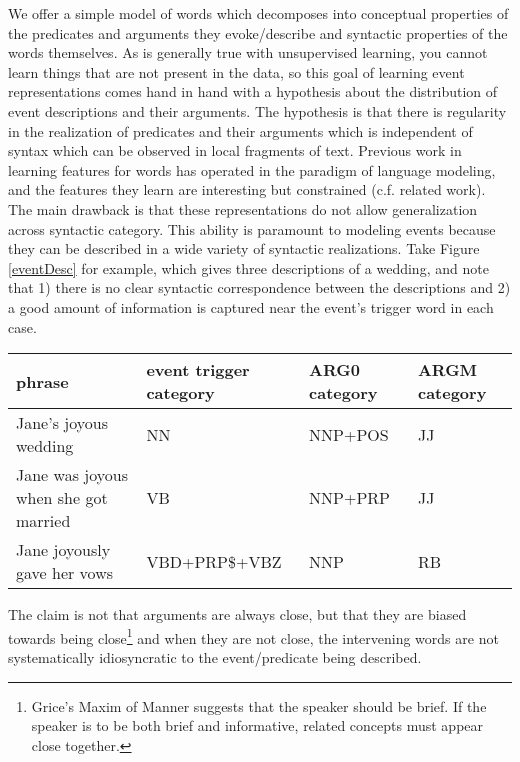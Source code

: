 \documentclass[11pt,letterpaper]{article}
\begin{document}
We offer a simple model of words which decomposes into conceptual properties
of the predicates and arguments they evoke/describe and syntactic properties
of the words themselves.
As is generally true with unsupervised learning, you cannot learn
things that are not present in the data, so this goal of learning event
representations comes hand in hand with a hypothesis about the
distribution of event descriptions and their arguments.
The hypothesis is that there is regularity in the realization of predicates
and their arguments which is independent of syntax which can be observed
in local fragments of text.
Previous work in learning features for words has operated in the
paradigm of language modeling, and the features they learn are
interesting but constrained (c.f. related work).
The main drawback is that these representations do not allow generalization
across syntactic category.
This ability is paramount to modeling events because they can be described
in a wide variety of syntactic realizations.
Take Figure \ref{eventDesc} for example, which gives three descriptions of a wedding,
and note that
1) there is no clear syntactic correspondence between the descriptions
and 2) a good amount of information is captured near the event's trigger word in each case.

% 
\begin{figure*}[ht]
\begin{tabular}{ | l | l | l | l | }
\hline
phrase & event trigger category & ARG0 category & ARGM category \\
\hline
Jane's joyous wedding & NN & NNP+POS & JJ \\
Jane was joyous when she got married & VB & NNP+PRP & JJ \\
Jane joyously gave her vows & VBD+PRP\$+VBZ & NNP & RB \\
\hline
\end{tabular}
\caption{three syntactically disparate descriptions of the same event}
\label{eventDesc}
\end{figure*}


The claim is not that arguments are always close, but
that they are biased towards being close\footnote{Grice's Maxim of Manner suggests
that the speaker should be brief. If the speaker is to be both brief and informative,
related concepts must appear close together.}
and when they are not close, the intervening words are not
systematically idiosyncratic to the event/predicate being described.
\end{document}
